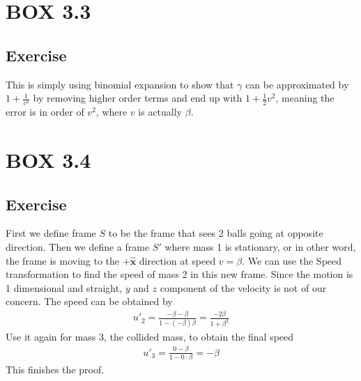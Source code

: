 \documentclass[12pt]{memoir}
\newcommand{\paren}[1]{\left( #1 \right)}
\newcommand{\unx}{\hat{\mathbf{x}}}
\begin{document}
        \section{BOX 3.3}
        \subsection{Exercise}
        This is simply using binomial expansion to show that $\gamma$ can be approximated by $1+\frac{1}{v^2}$ by removing higher order terms and end up with $1+\frac{1}{2}v^2$, meaning the error is in order of $v^2$, where $v$ is actually $\beta$.

        \section{BOX 3.4}
        \subsection{Exercise}
        First we define frame $S$ to be the frame that sees 2 balls going at opposite direction. Then we define a frame $S'$ where mass 1 is stationary, or in other word, the frame is moving to the $+\unx$ direction at speed $v=\beta$. We can use the Speed transformation to find the speed of mass 2 in this new frame. 
        Since the motion is 1 dimensional and straight, $y$ and $z$ component of the velocity is not of our concern. The speed can be obtained by
        \begin{align}
        u'_2 = \frac{-\beta - \beta}{1-\paren{-\beta}\beta} = \frac{-2\beta}{1+\beta^2}
        \end{align}
        Use it again for mass 3, the collided mass, to obtain the final speed
        \begin{align}
        u'_3 = \frac{0-\beta}{1-0\cdot\beta} = -\beta
        \end{align}
        This finishes the proof. 
        
\end{document}
